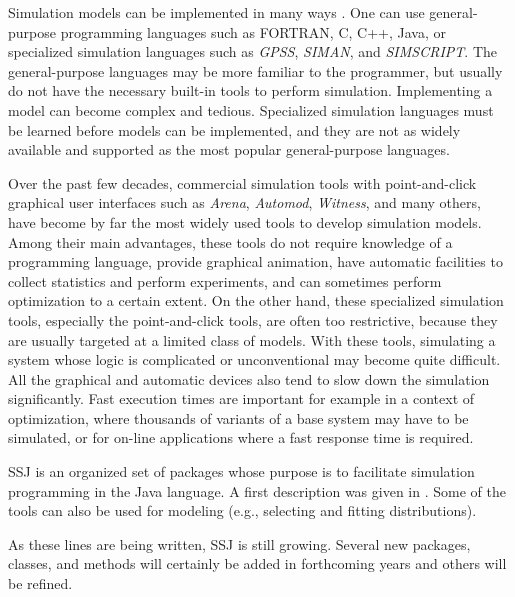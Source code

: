 \documentclass[12pt]{article}
\begin{document}
Simulation models can be implemented in many ways \cite{sLAW00a}.
One can use general-purpose programming languages such as 
FORTRAN, C, C++, Java, or specialized simulation languages such as
\emph{GPSS}, \emph{SIMAN}, and \emph{SIMSCRIPT}.
The general-purpose languages may be
more familiar to the programmer, but usually
do not have the necessary built-in tools to perform simulation.
Implementing a model can become complex and tedious.  
Specialized simulation languages must be learned before models 
can be implemented, and they are not as widely available and supported
as the most popular general-purpose languages.

Over the past few decades, commercial simulation tools with point-and-click 
graphical user interfaces such as \emph{Arena}, \emph{Automod},
 \emph{Witness}, 
and many others, have become by far the most widely used tools to develop
simulation models.  Among their main advantages, these tools do not require
knowledge of a programming language, provide graphical animation,
have automatic facilities to collect statistics and perform experiments,
and can sometimes perform optimization to a certain extent.
On the other hand, these specialized simulation tools,
especially the point-and-click tools, are often too restrictive, 
because they are usually targeted at a limited class of models.
With these tools, simulating a system whose logic is complicated or 
unconventional may become quite difficult.
All the graphical and automatic devices also tend to slow down the simulation
significantly.  Fast execution times are important for example in a context
of optimization, where thousands of variants of a base system may have to be
simulated, or for on-line applications where a fast response time is required.


SSJ is an organized set of packages whose purpose is to facilitate 
simulation programming in the Java language.
A first description was given in \cite{sLEC02a}.
Some of the tools can also be used for modeling (e.g., selecting
and fitting distributions).
\begin{comment}
A simulation library, such
as SSJ, extends the Java programming language to equip it with the
necessary tools for implementing complex models.  One can use a
familiar programming language, such as Java, with high-level tools for
simulation.  A simulation project can be divided in several tasks,
from modeling to implementation \cite{sLAW00a}.  SSJ provides tools
for model implementation and validation.
\end{comment}
As these lines are being written, SSJ is still growing.
Several new packages, classes, and methods will certainly be added in 
forthcoming years and others will be refined.
\end{document}

